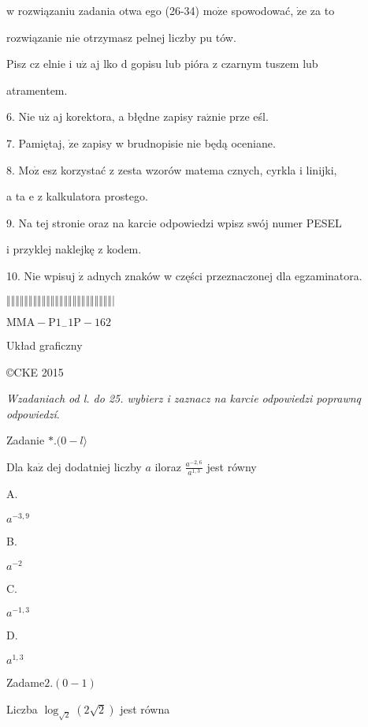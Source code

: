 \documentclass[a4paper,12pt]{article}
\begin{document}
w rozwiązaniu zadania otwa ego (26-34) $\mathrm{m}\mathrm{o}\dot{\mathrm{z}}\mathrm{e}$ spowodować, $\dot{\mathrm{z}}\mathrm{e}$ za to

rozwiązanie nie otrzymasz pelnej liczby pu tów.

Pisz cz elnie i $\mathrm{u}\dot{\mathrm{z}}$ aj lko $\mathrm{d}$ gopisu lub pióra z czarnym tuszem lub

atramentem.

6. Nie $\mathrm{u}\dot{\mathrm{z}}$ aj korektora, a błędne zapisy $\mathrm{r}\mathrm{a}\acute{\mathrm{z}}\mathrm{n}\mathrm{i}\mathrm{e}$ prze eśl.

7. Pamiętaj, $\dot{\mathrm{z}}\mathrm{e}$ zapisy w brudnopisie nie będą oceniane.

8. $\mathrm{M}\mathrm{o}\dot{\mathrm{z}}$ esz korzystać z zesta wzorów matema cznych, cyrkla i linijki,

a ta $\mathrm{e}$ z kalkulatora prostego.

9. Na tej stronie oraz na karcie odpowiedzi wpisz swój numer PESEL

i przyklej naklejkę z kodem.

10. Nie wpisuj $\dot{\mathrm{z}}$ adnych znaków w części przeznaczonej dla egzaminatora.

$\Vert\Vert\Vert\Vert\Vert\Vert\Vert\Vert\Vert\Vert\Vert\Vert\Vert\Vert\Vert\Vert\Vert\Vert\Vert\Vert\Vert\Vert\Vert\Vert|$

$\mathrm{M}\mathrm{M}\mathrm{A}-\mathrm{P}1_{-}1\mathrm{P}-162$

Układ graficzny

\copyright CKE 2015




{\it Wzadaniach od l. do 25. wybierz i zaznacz na karcie odpowiedzi poprawnq odpowiedzí}.

Zadanie $*.(0-l\rangle$

Dla $\mathrm{k}\mathrm{a}\dot{\mathrm{z}}$ dej dodatniej liczby $a$ iloraz $\displaystyle \frac{a^{-2,6}}{a^{1,3}}$ jest równy

A.

$a^{-3,9}$

B.

$a^{-2}$

C.

$a^{-1,3}$

D.

$a^{1,3}$

Zadam$\mathrm{e}2. (0-1)$

Liczba $\log_{\sqrt{2}}(2\sqrt{2})$ jest równa
\end{document}

